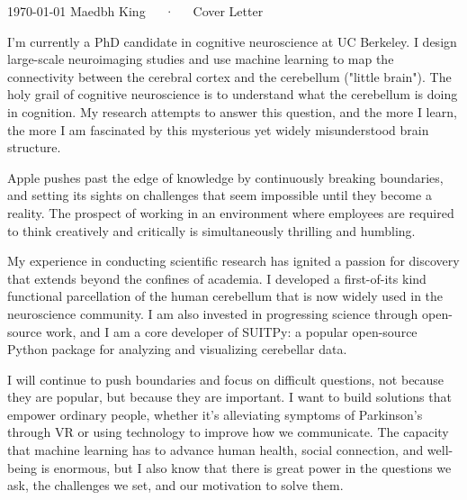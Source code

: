 \documentclass[11pt, a4paper]{maedbh-cv}
\begin{document}
\makecvheader[R]

\makecvfooter
  {\today}
  {Maedbh King~~~·~~~Cover Letter}
  {}

\makelettertitle

\begin{cvletter}

I'm currently a PhD candidate in cognitive neuroscience at UC Berkeley. I design large-scale neuroimaging studies and use machine learning to map the connectivity between the cerebral cortex and the cerebellum ("little brain"). The holy grail of cognitive neuroscience is to understand what the cerebellum is doing in cognition. My research attempts to answer this question, and the more I learn, the more I am fascinated by this mysterious yet widely misunderstood brain structure.

Apple pushes past the edge of knowledge by continuously breaking boundaries, and setting its sights on challenges that seem impossible until they become a reality. The prospect of working in an environment where employees are required to think creatively and critically is simultaneously thrilling and humbling.

My experience in conducting scientific research has ignited a passion for discovery that extends beyond the confines of academia. I developed a first-of-its kind functional parcellation of the human cerebellum that is now widely used in the neuroscience community. I am also invested in progressing science through open-source work, and I am a core developer of SUITPy: a popular open-source Python package for analyzing and visualizing cerebellar data.

I will continue to push boundaries and focus on difficult questions, not because they are popular, but because they are important. I want to build solutions that empower ordinary people, whether it's alleviating symptoms of Parkinson's through VR or using technology to improve how we communicate. The capacity that machine learning has to advance human health, social connection, and well-being is enormous, but I also know that there is great power in the questions we ask, the challenges we set, and our motivation to solve them.


\end{cvletter}


\makeletterclosing
\end{document}
